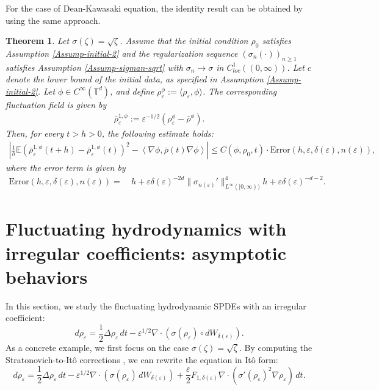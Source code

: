 \documentclass[UTF-8,reqno]{amsart}
\numberwithin{equation}{section}
\newtheorem{theorem}{Theorem}[section]
\def\geq{\geqslant}
\def\leq{\leqslant}
\def\geq{\geqslant}
\def\leq{\leqslant}
\begin{document}
For the case of Dean-Kawasaki equation, the identity result can be obtained by using the same approach. 
\begin{theorem}
Let $\sigma(\zeta)=\sqrt{\zeta}$. Assume that the initial condition $\rho_0$ satisfies Assumption \ref{Assump-initial-2} and the regularization sequence $(\sigma_n(\cdot))_{n \geq 1}$ satisfies Assumption \ref{Assump-sigman-sqrt} with $\sigma_n\rightarrow\sigma$ in $C^1_{loc}((0,\infty))$. Let $c$ denote the lower bound of the initial data, as specified in Assumption \ref{Assump-initial-2}. Let $\phi \in C^{\infty}(\mathbb{T}^d)$, and define $\rho_{\varepsilon}^{\phi} := \langle \rho_{\varepsilon}, \phi \rangle$. The corresponding fluctuation field is given by
\begin{align*}
\bar{\rho}_{\varepsilon}^{1,\phi} := \varepsilon^{-1/2}(\rho_{\varepsilon}^{\phi} - \bar{\rho}^{\phi}).
\end{align*}
Then, for every $t > h > 0$, the following estimate holds:
\begin{align*}
\left| \frac{1}{h} \mathbb{E} \left( \bar{\rho}_{\varepsilon}^{1,\phi}(t+h) - \bar{\rho}_{\varepsilon}^{1,\phi}(t) \right)^2 
- \left\langle \nabla \phi, \bar{\rho}(t) \nabla \phi \right\rangle \right|
\leq C(\phi, \rho_0, t) \cdot \mathrm{Error}(h, \varepsilon, \delta(\varepsilon), n(\varepsilon)),
\end{align*}
where the error term is given by
\begin{align*}
\mathrm{Error}(h, \varepsilon, \delta(\varepsilon), n(\varepsilon)) =\ & h 
+ \varepsilon \delta(\varepsilon)^{-2d} \|\sigma_{n(\varepsilon)}'\|_{L^{\infty}([0,\infty))}^4 h +\varepsilon \delta(\varepsilon)^{-d-2}. 
\end{align*}
\end{theorem} 



\section{Fluctuating hydrodynamics with irregular coefficients: asymptotic behaviors}\label{sec-6}
In this section, we study the fluctuating hydrodynamic SPDEs with an irregular coefficient:
\begin{equation}
d\rho_{\varepsilon} = \frac{1}{2}\Delta\rho_{\varepsilon}\,dt - \varepsilon^{1/2}\nabla\cdot(\sigma(\rho_{\varepsilon})\circ dW_{\delta(\varepsilon)}).
\end{equation}
As a concrete example, we first focus on the case $\sigma(\zeta) = \sqrt{\zeta}$. By computing the Stratonovich-to-It\^o corrections \cite{FG24}, we can rewrite the equation in It\^o form: 
\begin{equation}\label{SPDE-irregular-sec-6}
d\rho_{\varepsilon} = \frac{1}{2}\Delta\rho_{\varepsilon}\,dt - \varepsilon^{1/2}\nabla\cdot(\sigma(\rho_{\varepsilon})\,dW_{\delta(\varepsilon)}) + \frac{\varepsilon}{2}F_{1,\delta(\varepsilon)}\nabla\cdot(\sigma'(\rho_{\varepsilon})^2\nabla\rho_{\varepsilon})\,dt.
\end{equation}
\end{document}
